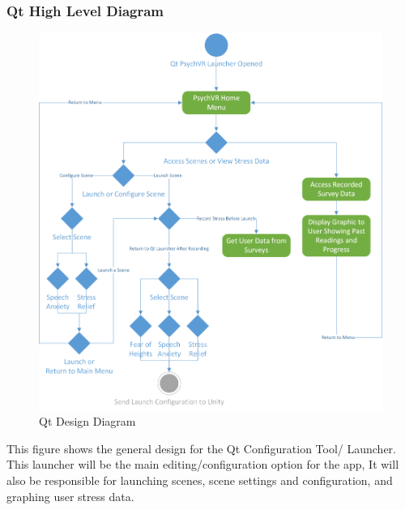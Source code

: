 \documentclass[a4paper,10pt]{article}
\begin{document}
		\subsubsection{Qt High Level Diagram}
		\begin{figure}[H]
			\includegraphics[width=\linewidth,height=\paperheight,keepaspectratio]{qtConfigDiag.png}
			\caption{Qt Design Diagram}
			\label{fig:qtHighLevel}
		\end{figure}
		This figure shows the general design for the Qt Configuration Tool/ Launcher. This launcher will be the main editing/configuration option for the app, It will also be responsible for launching scenes, scene settings and configuration, and graphing user stress data.

		\pagebreak
\end{document}
